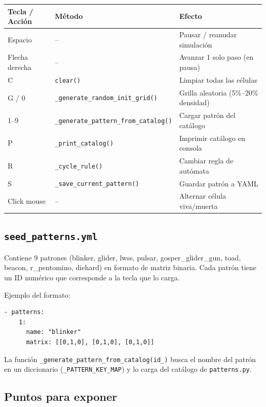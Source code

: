 \documentclass[12pt,a4paper]{article}
\begin{document}
\begin{table}[h]
\centering
\begin{tabular}{lll}
\toprule
\textbf{Tecla / Acción} & \textbf{Método} & \textbf{Efecto} \\
\midrule
Espacio        & --                 & Pausar / reanudar simulación \\
Flecha derecha & --                 & Avanzar 1 solo paso (en pausa) \\
C              & \texttt{clear()}   & Limpiar todas las células \\
G / 0          & \texttt{\_generate\_random\_init\_grid()} & Grilla aleatoria (5\%--20\% densidad) \\
1--9           & \texttt{\_generate\_pattern\_from\_catalog()} & Cargar patrón del catálogo \\
P              & \texttt{\_print\_catalog()} & Imprimir catálogo en consola \\
R              & \texttt{\_cycle\_rule()} & Cambiar regla de autómata \\
S              & \texttt{\_save\_current\_pattern()} & Guardar patrón a YAML \\
Click mouse    & --                 & Alternar célula viva/muerta \\
\bottomrule
\end{tabular}
\end{table}

\subsection{\texttt{seed\_patterns.yml}}

Contiene 9 patrones (blinker, glider, lwss, pulsar, gosper\_glider\_gun, toad, beacon,
r\_pentomino, diehard) en formato de matriz binaria. Cada patrón tiene un ID numérico
que corresponde a la tecla que lo carga.

Ejemplo del formato:
\begin{lstlisting}
- patterns:
    1:
      name: "blinker"
      matrix: [[0,1,0], [0,1,0], [0,1,0]]
\end{lstlisting}

La función \texttt{\_generate\_pattern\_from\_catalog(id\_)} busca el nombre del patrón
en un diccionario (\texttt{\_PATTERN\_KEY\_MAP}) y lo carga del catálogo de \texttt{patterns.py}.

\subsection{Puntos para exponer}
\end{document}
